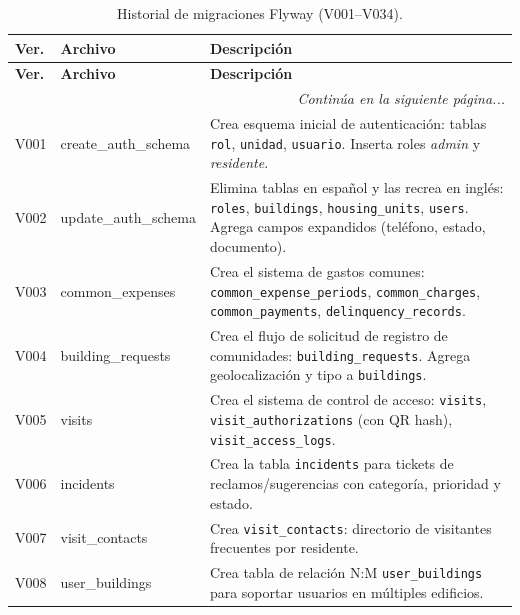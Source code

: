 \begin{longtable}{|p{}|p{}|p{}|}
\caption{Historial de migraciones Flyway (V001--V034).} \label{tab:migraciones} \\
\hline
\textbf{Ver.} & \textbf{Archivo} & \textbf{Descripción} \\ \hline
\endfirsthead
\hline \textbf{Ver.} & \textbf{Archivo} & \textbf{Descripción} \\ \hline
\endhead
\hline \multicolumn{3}{|r|}{\small\textit{Continúa en la siguiente página...}} \\ \hline
\endfoot
\hline
\endlastfoot

V001 & create\_auth\_schema & Crea esquema inicial de autenticación: tablas \texttt{rol}, \texttt{unidad}, \texttt{usuario}. Inserta roles \textit{admin} y \textit{residente}. \\ \hline

V002 & update\_auth\_schema & Elimina tablas en español y las recrea en inglés: \texttt{roles}, \texttt{buildings}, \texttt{housing\_units}, \texttt{users}. Agrega campos expandidos (teléfono, estado, documento). \\ \hline

V003 & common\_expenses & Crea el sistema de gastos comunes: \texttt{common\_expense\_periods}, \texttt{common\_charges}, \texttt{common\_payments}, \texttt{delinquency\_records}. \\ \hline

V004 & building\_requests & Crea el flujo de solicitud de registro de comunidades: \texttt{building\_requests}. Agrega geolocalización y tipo a \texttt{buildings}. \\ \hline

V005 & visits & Crea el sistema de control de acceso: \texttt{visits}, \texttt{visit\_authorizations} (con QR hash), \texttt{visit\_access\_logs}. \\ \hline

V006 & incidents & Crea la tabla \texttt{incidents} para tickets de reclamos/sugerencias con categoría, prioridad y estado. \\ \hline

V007 & visit\_contacts & Crea \texttt{visit\_contacts}: directorio de visitantes frecuentes por residente. \\ \hline

V008 & user\_buildings & Crea tabla de relación N:M \texttt{user\_buildings} para soportar usuarios en múltiples edificios. \\ \hline


\end{longtable}

